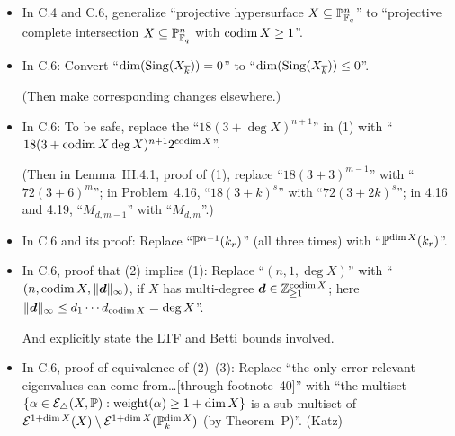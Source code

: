 \documentclass[12pt]{article}
\begin{document}
\begin{itemize}
\begin{itemize}
        \item In C.4 and C.6,
        generalize ``projective hypersurface $X\subseteq \mathbb{P}^n_{\mathbb{F}_q}$'' to ``projective complete intersection $X\subseteq \mathbb{P}^n_{\mathbb{F}_q}$ with $\operatorname{codim}{X}\geq 1$''.
        
        \item In C.6:
        Convert ``$\dim(\operatorname{Sing}(X_{\overline{k}}))=0$'' to ``$\dim(\operatorname{Sing}(X_{\overline{k}}))\leq 0$''.
        
        (Then make corresponding changes elsewhere.)
        
        \item In C.6:
        To be safe, replace the ``$18(3+\deg{X})^{n+1}$'' in (1) with ``$18(3+\operatorname{codim}{X}\deg{X})^{n+1}2^{\operatorname{codim}{X}}$''.
        
        (Then in Lemma~III.4.1, proof of (1),
        replace ``$18(3+3)^{m-1}$'' with ``$72(3+6)^m$'';
        in Problem~4.16,
        ``$18(3+k)^s$'' with ``$72(3+2k)^s$'';
        in 4.16 and 4.19,
        ``$M_{d,m-1}$'' with ``$M_{d,m}$''.)
        
        \item In C.6 and its proof:
        Replace ``$\mathbb{P}^{n-1}(k_r)$'' (all three times) with ``$\mathbb{P}^{\dim{X}}(k_r)$''.
        
        \item In C.6, proof that (2) implies (1):
        Replace ``$(n,1,\deg{X})$'' with ``$(n,\operatorname{codim}{X},\lVert \bm{d} \rVert_\infty)$,
        if $X$ has multi-degree $\bm{d}\in \mathbb{Z}_{\geq 1}^{\operatorname{codim}{X}}$;
        here $\lVert \bm{d} \rVert_\infty\leq d_1\cdots d_{\operatorname{codim}{X}} = \deg{X}$''.
        
        And explicitly state the LTF and Betti bounds involved.
        
        \item In C.6, proof of equivalence of (2)--(3):
        Replace ``the only error-relevant eigenvalues can come from\dots [through footnote~40]'' with ``the multiset $\{\alpha\in \mathcal{E}_{\triangle}(X,\mathbb{P}): \operatorname{weight}(\alpha)\geq 1+\dim{X}\}$
        is a sub-multiset of $\mathcal{E}^{1+\dim{X}}(X)\setminus \mathcal{E}^{1+\dim{X}}(\mathbb{P}^{\dim{X}}_k)$ (by Theorem~P)''.
        (Katz)
        

\end{itemize}
\end{itemize}
\end{document}
